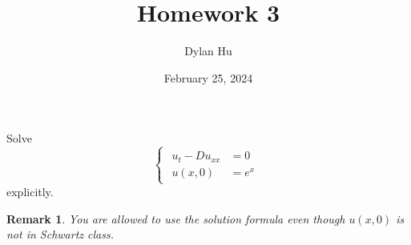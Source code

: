 \documentclass[plain]{pset}
\title{Homework 3}
\author{Dylan Hu}
\date{February 25, 2024}
\newtheorem*{remark*}{Remark}
\begin{document}
\maketitle

\pagebreak

\begin{problem}
Solve
\[\begin{cases}\begin{aligned}
            u_t - Du_{xx} & = 0   \\
            u(x, 0)       & = e^x
        \end{aligned}\end{cases}\]
explicitly.
\begin{remark*}
    You are allowed to use the solution formula even though \(u(x, 0)\) is not in Schwartz class.
\end{remark*}
\end{problem}
\end{document}
